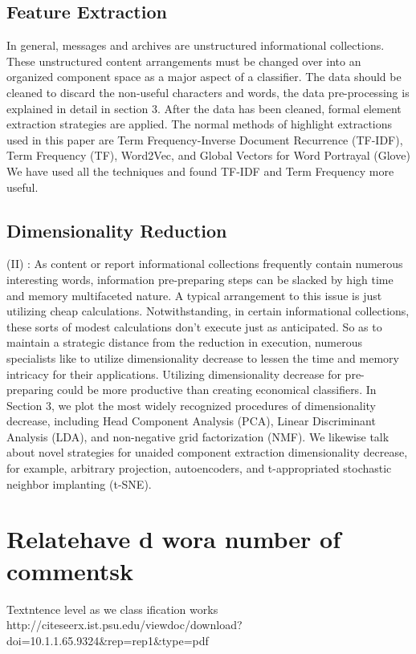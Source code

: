 \documentclass[conference]{IEEEtran}
\begin{document}
\subsection{Feature Extraction} 
In general, messages and archives are unstructured informational collections. These unstructured content arrangements must be changed over into an organized component space as a major aspect of a classifier. The data should be cleaned to discard the non-useful characters and words, the data pre-processing is explained in detail in section 3. After the data has been cleaned, formal element extraction strategies are applied. The normal methods of highlight extractions used in this paper are Term Frequency-Inverse Document Recurrence (TF-IDF), Term Frequency (TF), Word2Vec, and Global Vectors for Word Portrayal (Glove)
We have used all the techniques and found TF-IDF and Term Frequency more useful. 
\subsection{Dimensionality Reduction} 
(II) : As content or report informational collections frequently contain numerous interesting words, information pre-preparing steps can be slacked by high time and memory multifaceted nature. A typical arrangement to this issue is just utilizing cheap calculations. Notwithstanding, in certain informational collections, these sorts of modest calculations don't execute just as anticipated. So as to maintain a strategic distance from the reduction in execution, numerous specialists like to utilize dimensionality decrease to lessen the time and memory intricacy for their applications. Utilizing dimensionality decrease for pre-preparing could be more productive than creating economical classifiers. In Section 3, we plot the most widely recognized procedures of dimensionality decrease, including Head Component Analysis (PCA), Linear Discriminant Analysis (LDA), and non-negative grid factorization (NMF). We likewise talk about novel strategies for unaided component extraction dimensionality decrease, for example, arbitrary projection, autoencoders, and t-appropriated stochastic neighbor implanting (t-SNE).

\section{Relatehave d wora number of commentsk}
Textntence level as we  class ification works 
http://citeseerx.ist.psu.edu/viewdoc/download?doi=10.1.1.65.9324&rep=rep1&type=pdf
\end{document}
